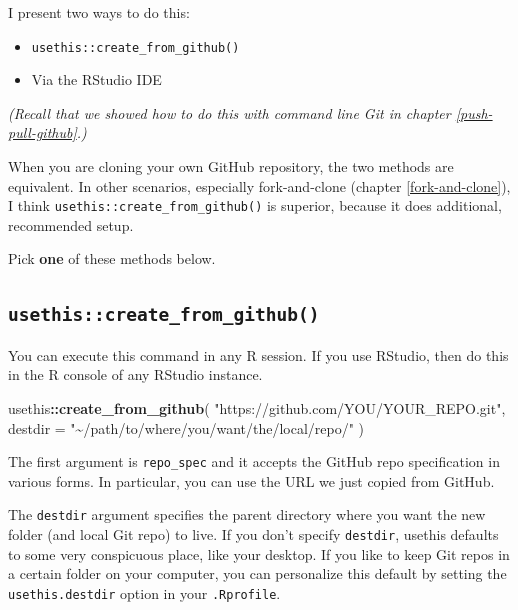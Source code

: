 \documentclass[
]{book}
\newenvironment{Shaded}{\begin{snugshade}}{\end{snugshade}}
\newcommand{\AttributeTok}[1]{\textcolor[rgb]{0.13,0.29,0.53}{#1}}
\newcommand{\FunctionTok}[1]{\textcolor[rgb]{0.13,0.29,0.53}{\textbf{#1}}}
\newcommand{\NormalTok}[1]{#1}
\newcommand{\SpecialCharTok}[1]{\textcolor[rgb]{0.81,0.36,0.00}{\textbf{#1}}}
\newcommand{\StringTok}[1]{\textcolor[rgb]{0.31,0.60,0.02}{#1}}
\providecommand{\tightlist}{%
  \setlength{\itemsep}{0pt}\setlength{\parskip}{0pt}}
\begin{document}
I present two ways to do this:

\begin{itemize}
\tightlist
\item
  \texttt{usethis::create\_from\_github()}
\item
  Via the RStudio IDE
\end{itemize}

\emph{(Recall that we showed how to do this with command line Git in chapter \ref{push-pull-github}.)}

When you are cloning your own GitHub repository, the two methods are equivalent.
In other scenarios, especially fork-and-clone (chapter \ref{fork-and-clone}), I think \texttt{usethis::create\_from\_github()} is superior, because it does additional, recommended setup.

Pick \textbf{one} of these methods below.

\subsection{\texorpdfstring{\texttt{usethis::create\_from\_github()}}{usethis::create\_from\_github()}}\label{usethiscreate_from_github-1}

You can execute this command in any R session.
If you use RStudio, then do this in the R console of any RStudio instance.

\begin{Shaded}
\begin{Highlighting}[]
\NormalTok{usethis}\SpecialCharTok{::}\FunctionTok{create\_from\_github}\NormalTok{(}
  \StringTok{"https://github.com/YOU/YOUR\_REPO.git"}\NormalTok{,}
  \AttributeTok{destdir =} \StringTok{"\textasciitilde{}/path/to/where/you/want/the/local/repo/"}
\NormalTok{)}
\end{Highlighting}
\end{Shaded}

The first argument is \texttt{repo\_spec} and it accepts the GitHub repo specification in various forms.
In particular, you can use the URL we just copied from GitHub.

The \texttt{destdir} argument specifies the parent directory where you want the new folder (and local Git repo) to live.
If you don't specify \texttt{destdir}, usethis defaults to some very conspicuous place, like your desktop.
If you like to keep Git repos in a certain folder on your computer, you can personalize this default by setting the \texttt{usethis.destdir} option in your \texttt{.Rprofile}.
\end{document}
